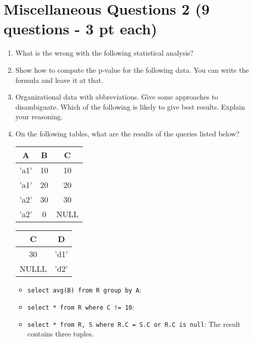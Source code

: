 \documentclass[11pt]{article}
\newcommand{\answer}[2]{\noindent {\bf Answer:} #2}
\renewcommand{\answer}[2]{\vspace{#1}}
\begin{document}
\section*{Miscellaneous Questions 2 (9 questions - 3 pt each)}
\begin{enumerate}

\item What is the wrong with the following statistical analysis?

\answer{2.8in}{ }

\item Show how to compute the p-value for the following data. You can write the formula and leave it at that.

\answer{2.5in}{ }

\item Organizational data with abbreviations. Give some approaches to disambiguate. Which of the
following is likely to give best results. Explain your reasoning.

\answer{2.5in}{ }

\item On the following tables, what are the results of the queries listed below?

\begin{table}[h]
\hspace{1in}{\bf R}\hspace{.2in}
    \begin{tabular}{|c|c|c|}
        \hline 
        {\bf A} & {\bf B} & {\bf C} \\
        \hline 
            'a1' & 10 & 10 \\
        \hline 
            'a1' & 20 & 20 \\
        \hline 
            'a2' & 30 & 30 \\
        \hline 
            'a2' & 0  & NULL \\
        \hline 
    \end{tabular}
\hspace{1in}{\bf S}\hspace{.2in}
    \begin{tabular}{|c|c|}
        \hline 
        {\bf C} & {\bf D} \\
        \hline 
        30 & 'd1' \\
        \hline 
        NULLL & 'd2' \\
        \hline 
    \end{tabular}
\end{table}

\begin{itemize}
\item {\tt select avg(B) from R group by A}:
\answer{1in}{('a1', 15), ('a2', 15)}
\item {\tt select * from R where C != 10}:
\answer{1in}{Second and third rows would be returned, but not the fourth}
\item {\tt select * from R, S where R.C = S.C or R.C is null}: The result contains three tuples.
\answer{1in}{('a2', 30, 30, 30, 'd1'), ('a2', 0, NULL, 30, 'd1'), ('a2', 0, NULL, NULL, 'd2')}
\end{itemize}


\end{enumerate}
\end{document}
